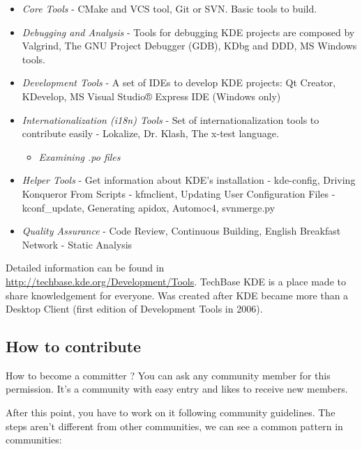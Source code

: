 \begin{itemize}
	\item \textit{Core Tools} - CMake and VCS tool, Git or SVN. Basic tools to build.
	\item \textit{Debugging and Analysis} - Tools for debugging KDE projects are composed by Valgrind, The GNU Project Debugger (GDB), KDbg and DDD, MS Windows tools.
	\item \textit{Development Tools} - A set of IDEs to develop KDE projects: Qt Creator, KDevelop, MS Visual Studio® Express IDE (Windows only)
	\item \textit{Internationalization (i18n) Tools} - Set of internationalization tools to contribute easily - Lokalize, Dr. Klash, The x-test language.
\begin{itemize}
	\item \textit{Examining .po files}
\end{itemize}
	\item \textit{Helper Tools} - Get information about KDE's installation - kde-config, Driving Konqueror From Scripts - kfmclient, Updating User Configuration Files - kconf\_update, Generating apidox, Automoc4, svnmerge.py
	\item \textit{Quality Assurance} - Code Review, Continuous Building, English Breakfast Network - Static Analysis
\end{itemize} Detailed information can be found in \href{http://techbase.kde.org/Development/Tools}{http://techbase.kde.org/Development/Tools}. TechBase KDE is a place made to share knowledgement for everyone. Was created after KDE became more than a Desktop Client (first edition of Development Tools in 2006).

\subsection{How to contribute}

\par How to become a committer ? You can ask any community member for this permission. It's a community with easy entry and likes to receive new members.

\par After this point, you have to work on it following community guidelines. The steps aren't different from other communities, we can see a common pattern in communities:

